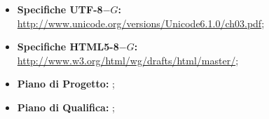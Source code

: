 \begin{itemize}
	\item \textbf{Specifiche UTF-8$-G$:} \href{http://www.unicode.org/versions/Unicode6.1.0/ch03.pdf}{http://www.unicode.org/versions/Unicode6.1.0/ch03.pdf};
	\item \textbf{Specifiche HTML5-8$-G$:} \href{http://www.w3.org/html/wg/drafts/html/master/}{http://www.w3.org/html/wg/drafts/html/master/};
	\item \textbf{Piano di Progetto:} \PdP ;
	\item \textbf{Piano di Qualifica:} \PdQ ;
\end{itemize}
